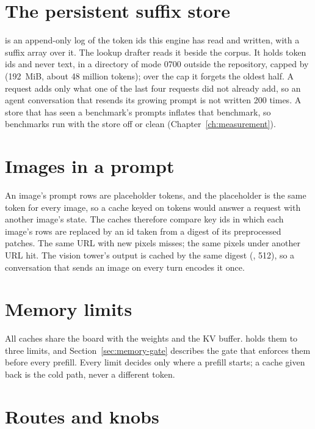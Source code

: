 \section{The persistent suffix store}\label{sec:suffix-store}

 is an append-only log of the token ids this engine has read and written, with a suffix array over it. The lookup drafter reads it beside the corpus. It holds token ids and never text, in a directory of mode 0700 outside the repository, capped by  (192~MiB, about 48 million tokens); over the cap it forgets the oldest half. A request adds only what one of the last four requests did not already add, so an agent conversation that resends its growing prompt is not written 200 times. A store that has seen a benchmark's prompts inflates that benchmark, so benchmarks run with the store off or clean (Chapter~\ref{ch:measurement}).

\section{Images in a prompt}

An image's prompt rows are placeholder tokens, and the placeholder is the same token for every image, so a cache keyed on tokens would answer a request with another image's state. The caches therefore compare key ids in which each image's rows are replaced by an id taken from a digest of its preprocessed patches. The same URL with new pixels misses; the same pixels under another URL hit. The vision tower's output is cached by the same digest (, 512), so a conversation that sends an image on every turn encodes it once.

\section{Memory limits}

All caches share the board with the weights and the KV buffer.  holds them to three limits, and Section~\ref{sec:memory-gate} describes the gate that enforces them before every prefill. Every limit decides only where a prefill starts; a cache given back is the cold path, never a different token.

\section{Routes and knobs}

